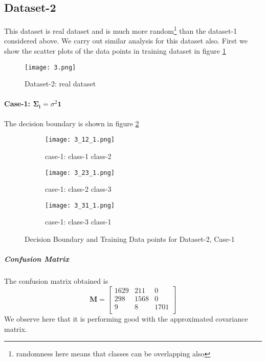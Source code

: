 \documentclass[a4paper]{article}
\begin{document}
\subsection{Dataset-2}
This dataset is real dataset and is much more random\footnote{randomness here means that classes can be overlapping also} than the dataset-1 considered above. We carry out similar analysis for this dataset also. First we show the scatter plots of the data points in training dataset in figure \ref{fig:3}
\begin{figure}[!h]
  \texttt{[image: 3.png]}
  \caption{Dataset-2: real dataset}
  \label{fig:3}
\end{figure}
\newpage
\paragraph{Case-1: $\mathbf{\Sigma_{i}}=\sigma^{2}\mathbf{1}$}
The decision boundary is shown in figure \ref{fig:3_1}
\begin{figure}[h!]
  \centering
  \begin{subfigure}[b]{0.4\linewidth}
    \texttt{[image: 3\_12\_1.png]}
     \caption{case-1: class-1 class-2}
  \end{subfigure}
  \begin{subfigure}[b]{0.4\linewidth}
    \texttt{[image: 3\_23\_1.png]}
    \caption{case-1: class-2 class-3}
  \end{subfigure}
  \begin{subfigure}[b]{0.4\linewidth}
    \texttt{[image: 3\_31\_1.png]}
    \caption{case-1: class-3 class-1}
  \end{subfigure}
  \caption{Decision Boundary and Training Data points for Dataset-2, Case-1}
  \label{fig:3_1}
\end{figure}
\subparagraph{Confusion Matrix}
The confusion matrix obtained is
\[
\mathbf{M} = \left[ {\begin{array}{ccc}
1629 & 211 & 0\\
298 & 1568 & 0\\
9 & 8 & 1701\\
\end{array}} \right]
\]We observe here that it is performing good with the approximated covariance matrix.\\
\end{document}
